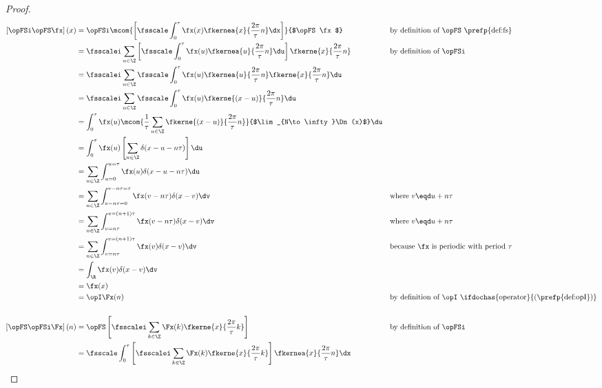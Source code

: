 \begin{proof}
\begin{align*}
     \left[\opFSi \opFS \fx\right](x)
       &=    \opFSi \mcom{\left[\fsscale \int_0^\tau \fx(x) \fkernea{x}{\frac{2\pi}{\tau}n} \dx\right]}
                         {$\opFS \fx$}
       &&    \text{by definition of $\opFS$ \prefp{def:fs}}
     \\&=    \fsscalei \sum_{n\in\Z} \left[\fsscale\int_0^\tau \fx(u) \fkernea{u}{\frac{2\pi}{\tau}n} \du \right] 
             \fkerne{x}{\frac{2\pi}{\tau}n}
       &&    \text{by definition of $\opFSi$}
     \\&=    \fsscalei \sum_{n\in\Z} \fsscale\int_0^\tau \fx(u) \fkernea{u}{\frac{2\pi}{\tau}n} \fkerne{x}{\frac{2\pi}{\tau}n}\du  
     \\&=    \fsscalei \sum_{n\in\Z} \fsscale\int_0^\tau \fx(u) \fkerne{(x-u)}{\frac{2\pi}{\tau}n} \du  
     \\&=    \int_0^\tau \fx(u) 
             \mcom{\frac{1}{\tau}\sum_{n\in\Z} \fkerne{(x-u)}{\frac{2\pi}{\tau}n}}
                  {$\lim_{N\to\infty}\Dn(x)$} 
             \du  
     \\&=    \int_0^\tau \fx(u) \left[\sum_{n\in\Z} \delta(x-u-n\tau)\right] \du  
     \\&=    \sum_{n\in\Z} \int_{u=0}^{u=\tau} \fx(u) \delta(x-u-n\tau)\du  
     \\&=    \sum_{n\in\Z} \int_{v-n\tau=0}^{v-n\tau=\tau} \fx(v-n\tau) \delta(x-v)\dv  
       &&    \text{where $v\eqd u+n\tau$}
     \\&=    \sum_{n\in\Z} \int_{v=n\tau}^{v=(n+1)\tau} \fx(v-n\tau) \delta(x-v)\dv  
       &&    \text{where $v\eqd u+n\tau$}
     \\&=    \sum_{n\in\Z} \int_{v=n\tau}^{v=(n+1)\tau} \fx(v) \delta(x-v)\dv  
       &&    \text{because $\fx$ is periodic with period $\tau$}
     \\&=    \int_{\R} \fx(v) \delta(x-v)\dv  
     \\&=    \fx(x) 
     \\&=    \opI \Fx(n)
       &&    \text{by definition of $\opI$ \ifdochas{operator}{(\prefp{def:opI})}} 
     \\
     \\
     \left[\opFS \opFSi \Fx\right](n)
       &=    \opFS \left[ \fsscalei\sum_{k\in\Z} \Fx(k) \fkerne{x}{\frac{2\pi}{\tau}k}  \right]
       &&    \text{by definition of $\opFSi$}
     \\&=    \fsscale\int_0^\tau \left[ \fsscalei\sum_{k\in\Z} \Fx(k) \fkerne{x}{\frac{2\pi}{\tau}k}  \right] \fkernea{x}{\frac{2\pi}{\tau}n} \dx

\end{align*}
\end{proof}
